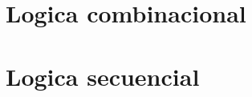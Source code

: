 \documentclass{beamer}
\begin{document}
\section{Logica combinacional}

\begin{frame}
\frametitle{}

\end{frame}

\begin{frame}
\frametitle{}

\end{frame}

\section{Logica secuencial}

\begin{frame}
\frametitle{}

\end{frame}

\begin{frame}
\frametitle{}

\end{frame}

\begin{frame}
\frametitle{}

\end{frame}

\begin{frame}
\frametitle{}

\end{frame}

\begin{frame}
\frametitle{}

\end{frame}
\end{document}
